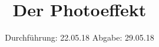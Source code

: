 

\subject{500}
\title{Der Photoeffekt}
\date{%
  Durchführung: 22.05.18
  \hspace{3em}
  Abgabe: 29.05.18
}



\maketitle
\thispagestyle{empty}
\tableofcontents
\newpage







\printbibliography{}


